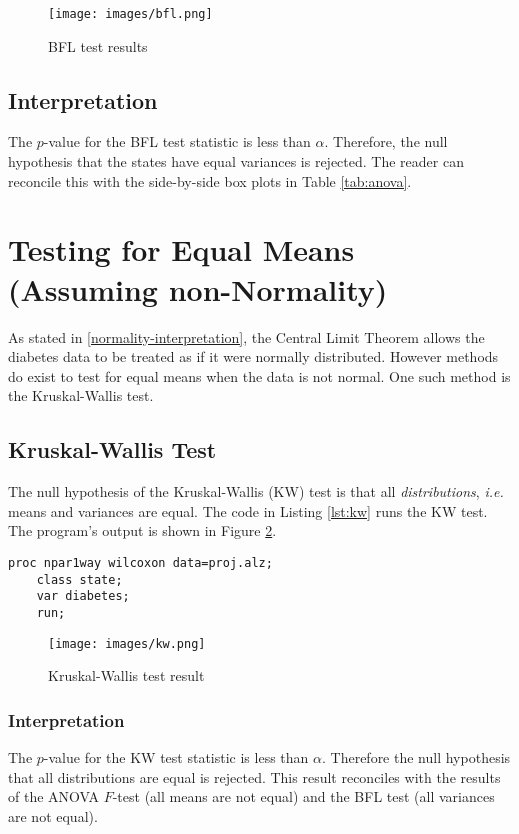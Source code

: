 \documentclass{article}
\begin{document}
\begin{figure}[ht]
    \centering
    \texttt{[image: images/bfl.png]}
    \caption{BFL test results}
    \label{fig:bfl}
\end{figure}

\subsection{Interpretation}
The $p$-value for the BFL test statistic is less than $\alpha$. Therefore, the null hypothesis that the states have equal variances is rejected. The reader can reconcile this with the side-by-side box plots in Table \ref{tab:anova}.

\section{Testing for Equal Means (Assuming non-Normality)}
As stated in \ref{normality-interpretation}, the Central Limit Theorem allows the diabetes data to be treated as if it were normally distributed. However methods do exist to test for equal means when the data is not normal. One such method is the Kruskal-Wallis test.

\subsection{Kruskal-Wallis Test}
The null hypothesis of the Kruskal-Wallis (KW) test is that all \textit{distributions}, \textit{i.e.} means and variances are equal. The code in Listing \ref{lst:kw} runs the KW test. The program's output is shown in Figure \ref{fig:kw}.

\begin{lstlisting}[language=SAS,caption=Kruskal-Wallis test SAS progam,captionpos=b,label=lst:kw]
    proc npar1way wilcoxon data=proj.alz;
    class state;
    var diabetes;
    run;
\end{lstlisting}

\begin{figure}[ht]
    \centering
    \texttt{[image: images/kw.png]}
    \caption{Kruskal-Wallis test result}
    \label{fig:kw}
\end{figure}

\subsubsection{Interpretation}
The $p$-value for the KW test statistic is less than $\alpha$. Therefore the null hypothesis that all distributions are equal is rejected. This result reconciles with the results of the ANOVA $F$-test (all means are not equal) and the BFL test (all variances are not equal).
\end{document}
